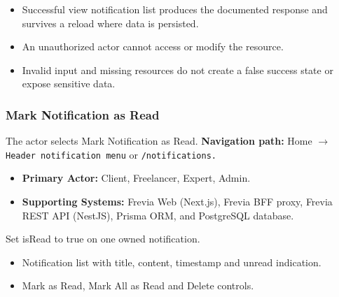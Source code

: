 \begin{itemize}[leftmargin=1.6em,topsep=3pt,itemsep=2pt,parsep=0pt,label=$\bullet$]
    \item Successful view notification list produces the documented response and survives a reload where data is persisted.
    \item An unauthorized actor cannot access or modify the resource.
    \item Invalid input and missing resources do not create a false success state or expose sensitive data.
\end{itemize}

\subsubsection{Mark Notification as Read}

The actor selects Mark Notification as Read.\newline
\textbf{Navigation path:} Home $\rightarrow$ \texttt{Header notification menu} or \texttt{/\allowbreak{}notifications.}


\begin{itemize}[leftmargin=1.6em,topsep=3pt,itemsep=2pt,parsep=0pt,label=$\bullet$]
    \item \textbf{Primary Actor:} Client, Freelancer, Expert, Admin.
    \item \textbf{Supporting Systems:} Frevia Web (Next.js), Frevia BFF proxy, Frevia REST API (NestJS), Prisma ORM, and PostgreSQL database.
\end{itemize}

\noindent Set isRead to true on one owned notification.

\begin{itemize}[leftmargin=1.6em,topsep=3pt,itemsep=2pt,parsep=0pt,label=$\bullet$]
    \item Notification list with title, content, timestamp and unread indication.
    \item Mark as Read, Mark All as Read and Delete controls.
\end{itemize}

